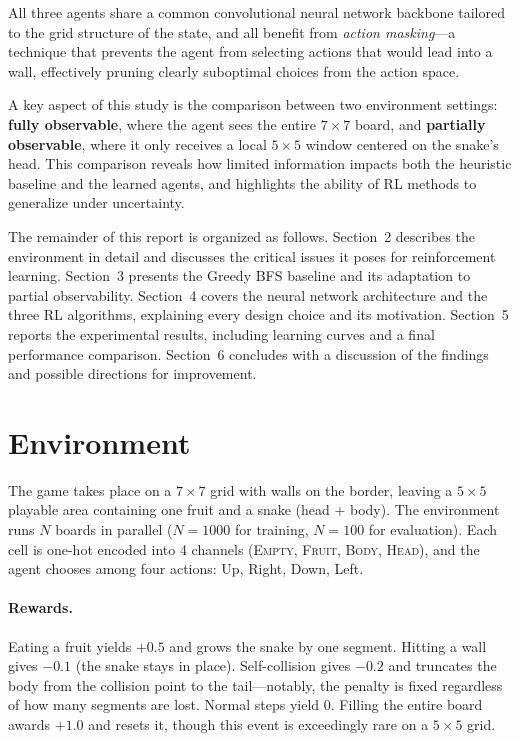 \documentclass[11pt, a4paper]{article}
\begin{document}
All three agents share a common convolutional neural network backbone tailored to the grid
structure of the state, and all benefit from \emph{action masking}---a technique that prevents
the agent from selecting actions that would lead into a wall, effectively pruning clearly
suboptimal choices from the action space.

A key aspect of this study is the comparison between two environment settings:
\textbf{fully observable}, where the agent sees the entire $7 \times 7$ board, and
\textbf{partially observable}, where it only receives a local $5 \times 5$ window centered on the
snake's head. This comparison reveals how limited information impacts both the heuristic baseline
and the learned agents, and highlights the ability of RL methods to generalize under uncertainty.

The remainder of this report is organized as follows. Section~2 describes the environment in
detail and discusses the critical issues it poses for reinforcement learning.
Section~3 presents the Greedy BFS baseline and its adaptation to partial observability.
Section~4 covers the neural network architecture and the three RL algorithms, explaining every
design choice and its motivation. Section~5 reports the experimental results, including learning
curves and a final performance comparison. Section~6 concludes with a discussion of the
findings and possible directions for improvement.

\section{Environment}

The game takes place on a $7 \times 7$ grid with walls on the border, leaving a $5 \times 5$
playable area containing one fruit and a snake (head + body). The environment runs $N$ boards
in parallel ($N{=}1000$ for training, $N{=}100$ for evaluation). Each cell is one-hot encoded
into 4 channels (\textsc{Empty}, \textsc{Fruit}, \textsc{Body}, \textsc{Head}), and the agent
chooses among four actions: Up, Right, Down, Left.

\paragraph{Rewards.}
Eating a fruit yields $+0.5$ and grows the snake by one segment. Hitting a wall gives $-0.1$
(the snake stays in place). Self-collision gives $-0.2$ and truncates the body from the
collision point to the tail---notably, the penalty is fixed regardless of how many segments are
lost. Normal steps yield $0$. Filling the entire board awards $+1.0$ and resets it, though this
event is exceedingly rare on a $5 \times 5$ grid.
\end{document}
